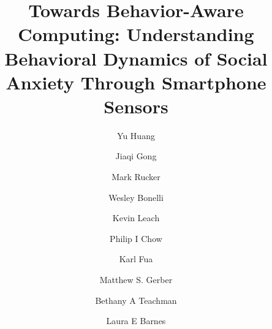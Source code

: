 \documentclass[acmlarge]{acmart}
\begin{document}
\title[Understanding Behavioral Dynamics of Social Anxiety Through Smartphone Sensors]{Towards Behavior-Aware Computing: Understanding Behavioral Dynamics of Social Anxiety Through Smartphone Sensors} 
%
\author{Yu Huang}
\author{Jiaqi Gong}
\author{Mark Rucker}
\author{Wesley Bonelli}
\author{Kevin Leach}
\author{Philip I Chow}
\author{Karl Fua}
\author{Matthew S. Gerber}
\author{Bethany A Teachman}
\author{Laura E Barnes}
\end{document}
